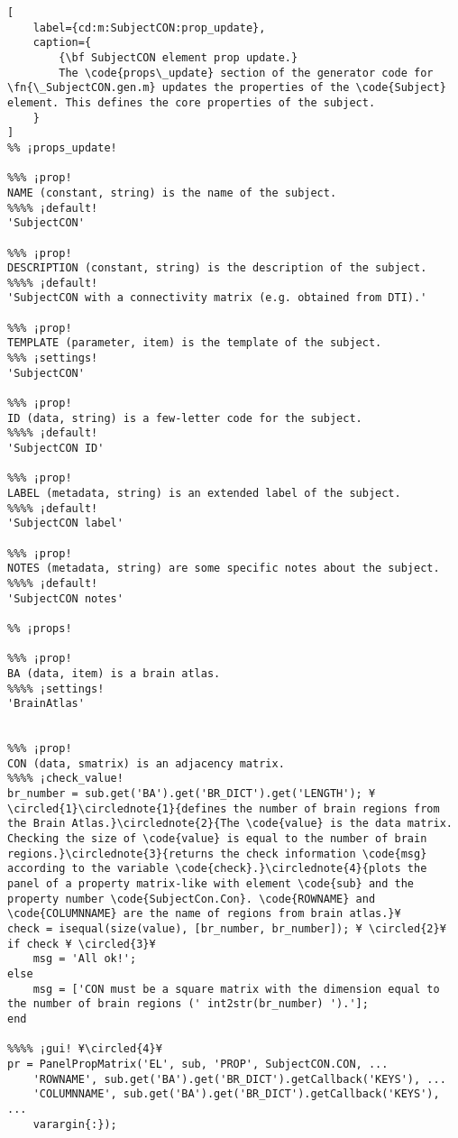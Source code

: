 \documentclass{tufte-handout}
\begin{document}
\begin{lstlisting}[
	label={cd:m:SubjectCON:prop_update},
	caption={
		{\bf SubjectCON element prop update.}
		The \code{props\_update} section of the generator code for \fn{\_SubjectCON.gen.m} updates the properties of the \code{Subject} element. This defines the core properties of the subject.
	}
]
%% ¡props_update!

%%% ¡prop!
NAME (constant, string) is the name of the subject.
%%%% ¡default!
'SubjectCON'

%%% ¡prop!
DESCRIPTION (constant, string) is the description of the subject.
%%%% ¡default!
'SubjectCON with a connectivity matrix (e.g. obtained from DTI).'

%%% ¡prop!
TEMPLATE (parameter, item) is the template of the subject.
%%% ¡settings!
'SubjectCON'

%%% ¡prop!
ID (data, string) is a few-letter code for the subject.
%%%% ¡default!
'SubjectCON ID'

%%% ¡prop!
LABEL (metadata, string) is an extended label of the subject.
%%%% ¡default!
'SubjectCON label'

%%% ¡prop!
NOTES (metadata, string) are some specific notes about the subject.
%%%% ¡default!
'SubjectCON notes'

%% ¡props!

%%% ¡prop! 
BA (data, item) is a brain atlas.
%%%% ¡settings!
'BrainAtlas'


%%% ¡prop! 
CON (data, smatrix) is an adjacency matrix.
%%%% ¡check_value!
br_number = sub.get('BA').get('BR_DICT').get('LENGTH'); ¥\circled{1}\circlednote{1}{defines the number of brain regions from the Brain Atlas.}\circlednote{2}{The \code{value} is the data matrix. Checking the size of \code{value} is equal to the number of brain regions.}\circlednote{3}{returns the check information \code{msg} according to the variable \code{check}.}\circlednote{4}{plots the panel of a property matrix-like with element \code{sub} and the property number \code{SubjectCon.Con}. \code{ROWNAME} and \code{COLUMNNAME} are the name of regions from brain atlas.}¥
check = isequal(size(value), [br_number, br_number]); ¥ \circled{2}¥
if check ¥ \circled{3}¥
    msg = 'All ok!';
else   
    msg = ['CON must be a square matrix with the dimension equal to the number of brain regions (' int2str(br_number) ').'];
end

%%%% ¡gui! ¥\circled{4}¥
pr = PanelPropMatrix('EL', sub, 'PROP', SubjectCON.CON, ...
    'ROWNAME', sub.get('BA').get('BR_DICT').getCallback('KEYS'), ...
    'COLUMNNAME', sub.get('BA').get('BR_DICT').getCallback('KEYS'), ...
    varargin{:});
\end{lstlisting}
\end{document}
